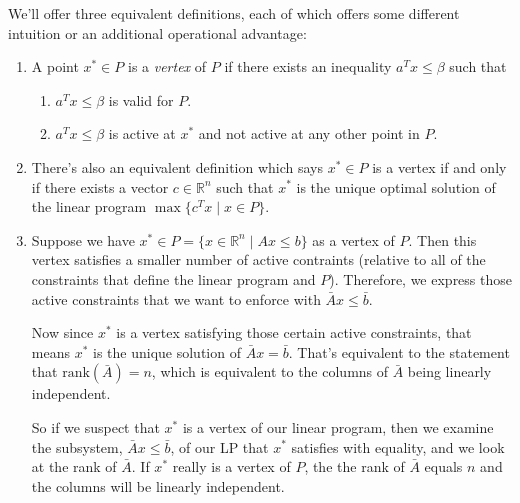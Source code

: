 \documentclass[a4paper,12pt]{scrartcl}
\theoremstyle{definition}
\theoremstyle{remark}
\begin{document}
We'll offer three equivalent definitions, each of which offers some
different intuition or an additional operational advantage:
\begin{enumerate}
   \item A point $x^* \in P$ is a \emph{vertex} of $P$ if
      there exists an inequality $a^T x \leq \beta$ such that
      \begin{enumerate}
	 \item $a^T x \leq \beta$ is valid for $P$.
	 \item $a^T x \leq \beta$ is active at $x^*$ and not active
	    at any other point in $P$.
      \end{enumerate}
   \item There's also an equivalent definition which says $x^* \in P$
      is a vertex if and only if there exists a vector $c \in
      \mathbb{R}^n$ such that $x^*$ is the unique optimal solution of
      the linear program $\max \{ c^T x \; | \; x \in P \}$.
   \item Suppose we have $x^* \in P = \{ x \in \mathbb{R}^n \; | \;
      Ax \leq b \}$ as a vertex of $P$.
      Then this vertex satisfies a smaller number of active contraints
      (relative to all of the constraints that define the linear
      program and $P$). Therefore, we express those active constraints
      that we want to enforce with $\bar{A}x \leq \bar{b}$.

      Now since $x^*$ is a vertex satisfying those
      certain active constraints, that means $x^*$ is the unique
      solution of $\bar{A} x = \bar{b}$. That's equivalent to the
      statement that $\text{rank}(\bar{A}) = n$, which is equivalent
      to the columns of $\bar{A}$ being linearly independent.

      So if we suspect that $x^*$ is a vertex of our linear program,
      then we examine the subsystem, $\bar{A} x \leq \bar{b}$,
      of our LP that $x^*$ satisfies with equality, and we look
      at the rank of $\bar{A}$. If $x^*$ really is a vertex of $P$,
      the the rank of $\bar{A}$ equals $n$ and the columns will
      be linearly independent.

\end{enumerate}
\end{document}
